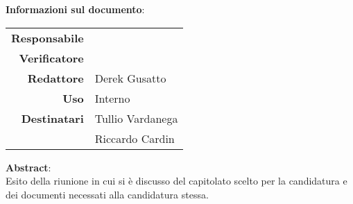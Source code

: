 \begin{center}
\textbf{Informazioni sul documento}: \\
\vspace{0.5cm}

\begin{tabular}{r|l}
    \textbf{Responsabile} &  \\ 
    \textbf{Verificatore} &  \\ 
    \textbf{Redattore} &  Derek Gusatto   \\ 
    \textbf{Uso} & Interno \\ 
    \textbf{Destinatari} & Tullio Vardanega \\ & Riccardo Cardin \\ 
\end{tabular}

\vfill

\textbf{Abstract}: \\
\vspace{0.5cm}
Esito della riunione in cui si è discusso del capitolato scelto per la candidatura e dei documenti necessati alla candidatura stessa.
\end{center}


\bigskip
